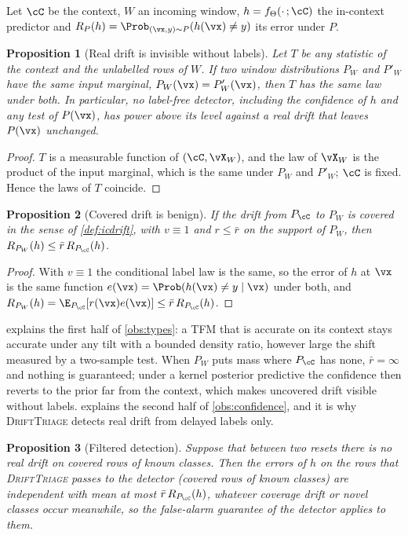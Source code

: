 \documentclass{article}
\theoremstyle{plain}
\newtheorem{proposition}{Proposition}
\theoremstyle{definition}
\theoremstyle{remark}
\newcommand{\method}{\textsc{DriftTriage}}   %
\begin{document}
Let $\cC$ be the context, $W$ an incoming window, $h=f_{\Theta}(\cdot\,;\cC)$ the in-context predictor and
$R_P(h)=\Prob_{(\vx,y)\sim P}(h(\vx)\neq y)$ its error under $P$.

\begin{proposition}[Real drift is invisible without labels]\label{prop:ident}
Let $T$ be any statistic of the context and the unlabelled rows of $W$. If two window distributions $P_W$ and $P'_W$
have the same input marginal, $P_W(\vx)=P'_W(\vx)$, then $T$ has the same law under both. In particular, no label-free
detector, including the confidence of $h$ and any test of $P(\vx)$, has power above its level against a real drift that
leaves $P(\vx)$ unchanged.
\end{proposition}

\begin{proof}
$T$ is a measurable function of $(\cC,\vX_W)$, and the law of $\vX_W$ is the product of the input marginal, which is
the same under $P_W$ and $P'_W$; $\cC$ is fixed. Hence the laws of $T$ coincide.
\end{proof}

\begin{proposition}[Covered drift is benign]\label{prop:covered}
If the drift from $P_{\cC}$ to $P_W$ is covered in the sense of \cref{def:icdrift}, with $v\equiv1$ and
$r\le\bar r$ on the support of $P_W$, then $R_{P_W}(h)\le\bar r\,R_{P_{\cC}}(h)$.
\end{proposition}

\begin{proof}
With $v\equiv1$ the conditional label law is the same, so the error of $h$ at $\vx$ is the same function
$e(\vx)=\Prob(h(\vx)\neq y\mid\vx)$ under both, and $R_{P_W}(h)=\E_{P_{\cC}}[r(\vx)e(\vx)]\le\bar r\,R_{P_{\cC}}(h)$.
\end{proof}

 explains the first half of \cref{obs:types}: a TFM that is accurate on its context stays accurate
under any tilt with a bounded density ratio, however large the shift measured by a two-sample test. When $P_W$ puts mass
where $P_{\cC}$ has none, $\bar r=\infty$ and nothing is guaranteed; under a kernel posterior predictive the confidence
then reverts to the prior far from the context, which makes uncovered drift visible without labels.
 explains the second half of \cref{obs:confidence}, and it is why \method{} detects real drift from
delayed labels only.

\begin{proposition}[Filtered detection]\label{prop:filter}
Suppose that between two resets there is no real drift on covered rows of known classes. Then the errors of $h$ on
the rows that \method{} passes to the detector (covered rows of known classes) are independent with mean at most
$\bar r\,R_{P_{\cC}}(h)$, whatever coverage drift or novel classes occur meanwhile, so the false-alarm guarantee of
the detector \citep{gama2014survey} applies to them.
\end{proposition}
\end{document}
